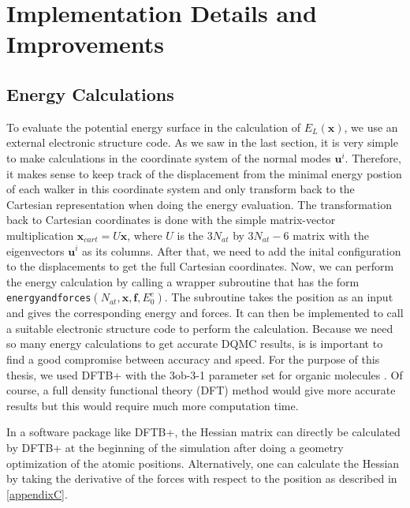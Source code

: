 \documentclass [12pt]{report}
\begin{document}
\section{Implementation Details and Improvements}
\subsection{Energy Calculations}
To evaluate the potential energy surface in the calculation of $E_L(\bm{x})$, we use an external electronic structure code. As we saw in the last section, it is very simple to make calculations in the coordinate system of the normal modes $\bm{u}^i$. Therefore, it makes sense to keep track of the displacement from the minimal energy postion of each walker in this coordinate system and only transform back to the Cartesian representation when doing the energy evaluation. The transformation back to Cartesian coordinates is done with the simple matrix-vector multiplication $\bm{x}_{cart} = U\bm{x}$, where $U$ is the $3N_{at}$ by $3N_{at} - 6$ matrix with the eigenvectors $\bm{u}^i$ as its columns. After that, we need to add the inital configuration to the displacements to get the full Cartesian coordinates. Now, we can perform the energy calculation by calling a wrapper subroutine that has the form \verb+energyandforces+$(N_{at},\bm{x},\bm{f},E^e_0)$. The subroutine takes the position as an input and gives the corresponding energy and forces. It can then be implemented to call a suitable electronic structure code to perform the calculation. Because we need so many energy calculations to get accurate DQMC results, is is important to find a good compromise between accuracy and speed. For the purpose of this thesis, we used DFTB+ \cite{dftbp,dftbp2} with the 3ob-3-1 parameter set for organic molecules \cite{3ob-3-1}. Of course, a full density functional theory (DFT) method would give more accurate results but this would require much more computation time.

In a software package like DFTB+, the Hessian matrix can directly be calculated by DFTB+ at the beginning of the simulation after doing a geometry optimization of the atomic positions. Alternatively, one can calculate the Hessian by taking the derivative of the forces with respect to the position as described in \ref{appendixC}.
\end{document}
